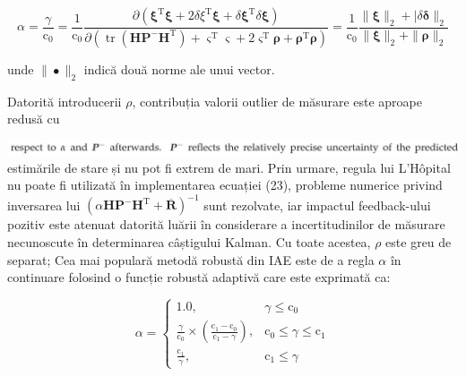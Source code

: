 \documentclass[10pt]{report}
\begin{document}
\begin{equation}
  \alpha=\frac{\gamma}{\mathrm{c}_{0}}=\frac{1}{\mathrm{c}_{0}} \frac{\partial\left(\boldsymbol{\xi}^{\mathrm{T}} \boldsymbol{\xi}+2 \delta \xi^{\mathrm{T}} \boldsymbol{\xi}+\delta \boldsymbol{\xi}^{\mathrm{T}} \delta \boldsymbol{\xi}\right)}{\partial\left(\operatorname{tr}\left(\boldsymbol{H} \boldsymbol{P}^{-} \boldsymbol{H}^{\mathrm{T}}\right)+\boldsymbol{\varsigma}^{\mathrm{T}} \boldsymbol{\varsigma}+2 \boldsymbol{\varsigma}^{\mathrm{T}} \boldsymbol{\rho}+\boldsymbol{\rho}^{\mathrm{T}} \boldsymbol{\rho}\right)}=\frac{1}{\mathrm{c}_{0}} \frac{\|\boldsymbol{\xi}\|_{2}+\mid \delta \boldsymbol{\delta} \|_{2}}{\|\boldsymbol{\xi}\|_{2}+\|\boldsymbol{\rho}\|_{2}}
\end{equation}


unde $\|\bullet\|_{2}$ indică două norme ale unui vector.

Datorită introducerii $\rho$, contribuția valorii outlier de măsurare este aproape redusă cu

\includegraphics[max width=\textwidth, center]{2023_06_04_c79b87a911fb798e1754g-5}
estimările de stare și nu pot fi extrem de mari. Prin urmare, regula lui L'Hôpital nu poate fi utilizată în implementarea ecuației (23), probleme numerice privind inversarea lui $\left(\alpha \boldsymbol{H P}^{-} \boldsymbol{H}^{\mathrm{T }}+\overline{\boldsymbol{R}}\right)^{-1}$ sunt rezolvate, iar impactul feedback-ului pozitiv este atenuat datorită luării în considerare a incertitudinilor de măsurare necunoscute în determinarea câștigului Kalman. Cu toate acestea, $\rho$ este greu de separat; Cea mai populară metodă robustă din IAE este de a regla $\alpha$ în continuare folosind o funcție robustă adaptivă care este exprimată ca:

\begin{equation}
  \alpha=\left\{\begin{array}{cc}
    1.0,                                                                                                          & \gamma \leq \mathrm{c}_{0}                     \\
    \frac{\gamma}{\mathrm{c}_{0}} \times\left(\frac{\mathrm{c}_{1}-\mathrm{c}_{0}}{\mathrm{c}_{1}-\gamma}\right), & \mathrm{c}_{0} \leq \gamma \leq \mathrm{c}_{1} \\
    \frac{\mathrm{c}_{1}}{\gamma},                                                                                & \mathrm{c}_{1} \leq \gamma
  \end{array}\right.
\end{equation}
\end{document}
